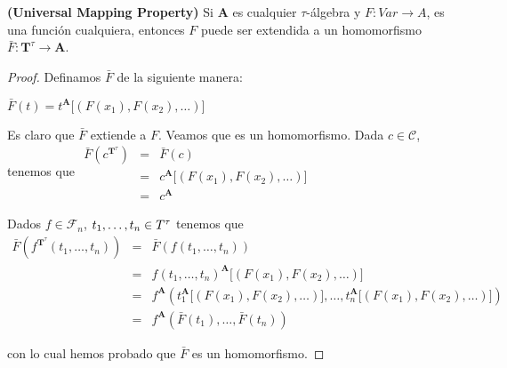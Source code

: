   \begin{lemma} \label{lemma_86}
    \PN \textbf{(Universal Mapping Property)} Si $\mathbf{A}$ es cualquier $\tau$-álgebra y $F: Var \rightarrow A$, es
    una función cualquiera, entonces $F$ puede ser extendida a un homomorfismo $\bar{F}: \mathbf{T}^{\tau} \rightarrow
    \mathbf{A}$.
  \end{lemma}
  \begin{proof}
    Definamos $\bar{F}$ de la siguiente manera:

    $\displaystyle \bar{F}(t)=t^{\mathbf{A}}\lbrack(F(x_{1}),F(x_{2}),\dotsc)\rbrack $

    Es claro que $\bar{F}$ extiende a $F$. Veamos que es un homomorfismo. Dada $ c\in \mathcal{C}$, tenemos que
    $\displaystyle \begin{array}{lll} \bar{F}(c^{\mathbf{T}^{\tau }}) & = & \bar{F}(c) \\ & = & c^{\mathbf{A}}\lbrack(F(x_{1}),F(x_{2}),\dotsc)\rbrack \\ & = & c^{\mathbf{A}} \end{array} $

    Dados $f\in \mathcal{F}_{n}$, $t_{1}, \dotsc, t_{n}\in T^{\tau}$ tenemos que
    $\displaystyle \begin{array}{lll} \bar{F}(f^{\mathbf{T}^{\tau }}(t_{1}, \dotsc, t_{n})) & = & \bar{F} (f(t_{1}, \dotsc, t_{n})) \\ & = & f(t_{1}, \dotsc, t_{n})^{\mathbf{A}}\lbrack(F(x_{1}),F(x_{2}),\dotsc)\rbrack \\ & = & f^{\mathbf{A}}(t_{1}^{\mathbf{A}}\lbrack(F(x_{1}),F(x_{2}),\dotsc)\rbrack, \dotsc, t_{n}^{ \mathbf{A}}\lbrack(F(x_{1}),F(x_{2}),\dotsc)\rbrack) \\ & = & f^{\mathbf{A}}(\bar{F}(t_{1}), \dotsc, \bar{F}(t_{n})) \end{array} $

    con lo cual hemos probado que $\bar{F}$ es un homomorfismo.
  \end{proof}

